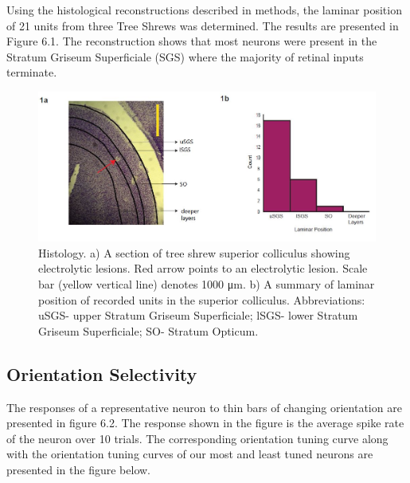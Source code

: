 		Using the histological reconstructions described in methods, the laminar position of 21 units from three Tree Shrews was determined. The results are presented in Figure 6.1. The reconstruction shows that most neurons were present in the Stratum Griseum Superficiale (SGS) where the majority of retinal inputs terminate.
			\begin{figure}
			
				\includegraphics[width=\linewidth]{SCLaminarPosition.jpg}
				\caption{Histology. a) A section of tree shrew superior colliculus showing electrolytic lesions. Red arrow
					points to an electrolytic lesion. Scale bar (yellow vertical line) denotes 1000 μm. b) A summary of laminar
					position of recorded units in the superior colliculus. Abbreviations: uSGS- upper Stratum Griseum Superficiale;
					lSGS- lower Stratum Griseum Superficiale; SO- Stratum Opticum.}
				\label{fig:fig1}
			\end{figure}
			
		
			
	\subsection{Orientation Selectivity}
		
		The responses of a representative neuron to thin bars of changing orientation are presented in figure 6.2. The response shown in the figure is the average spike rate of the neuron over 10 trials. The corresponding orientation tuning curve along with the orientation tuning curves of our most and least tuned neurons are presented in the figure below. 
		
